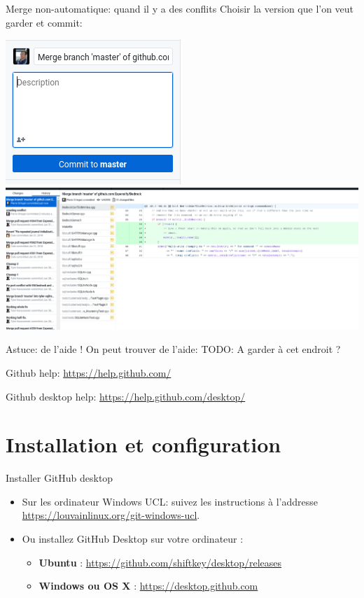 \documentclass{beamer}
\begin{document}
\begin{frame}{Merge non-automatique: quand il y a des conflits}
    Choisir la version que l'on veut garder et commit:\\
    \begin{center}
	 	   \includegraphics[scale=0.4]{img/github_desktop/conflit_4.png}\\
	 	   \includegraphics[scale=0.2]{img/github_desktop/conflit_5.png}
    \end{center}
\end{frame}

\begin{frame}{Astuce: de l'aide !}
    On peut trouver de l'aide:
    TODO: A garder à cet endroit ?
    
    Github help: \url{https://help.github.com/}
        
    Github desktop help: \url{https://help.github.com/desktop/}
\end{frame}


\section{Installation et configuration}

\begin{frame}{Installer GitHub desktop}
\begin{itemize}
    \item Sur les ordinateur Windows UCL: suivez les instructions à l'addresse {\small\url{https://louvainlinux.org/git-windows-ucl}}.
    \item Ou installez GitHub Desktop sur votre ordinateur :
    \begin{itemize}
        \item \textbf{Ubuntu} : \url{https://github.com/shiftkey/desktop/releases}
        \item \textbf{Windows ou OS X} : \url{https://desktop.github.com}
    \end{itemize}
\end{itemize}
\end{frame}
\end{document}
